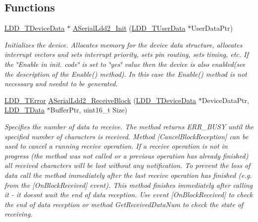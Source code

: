 \subsection*{Functions}
\begin{DoxyCompactItemize}
\item 
\hyperlink{group___p_e___types__module_gac5cf1362f1f0e3a2ce71b1bf2276d091}{L\+D\+D\+\_\+\+T\+Device\+Data} $\ast$ \hyperlink{group___a_serial_ldd2__module_gaa0cd7e49c9c5deb19ce7f9ece16231c3}{A\+Serial\+Ldd2\+\_\+\+Init} (\hyperlink{group___p_e___types__module_ga0b66a73f87238a782318aa0be7578e35}{L\+D\+D\+\_\+\+T\+User\+Data} $\ast$User\+Data\+Ptr)
\begin{DoxyCompactList}\small\item\em Initializes the device. Allocates memory for the device data structure, allocates interrupt vectors and sets interrupt priority, sets pin routing, sets timing, etc. If the \char`\"{}\+Enable
    in init. code\char`\"{} is set to \char`\"{}yes\char`\"{} value then the device is also enabled(see the description of the Enable() method). In this case the Enable() method is not necessary and needn\textquotesingle{}t to be generated. \end{DoxyCompactList}\item 
\hyperlink{group___p_e___types__module_ga24c2b045fd04e79e85f261ce4df35588}{L\+D\+D\+\_\+\+T\+Error} \hyperlink{group___a_serial_ldd2__module_gaf41a4ccffe5f5791cbc9b6e6e912962d}{A\+Serial\+Ldd2\+\_\+\+Receive\+Block} (\hyperlink{group___p_e___types__module_gac5cf1362f1f0e3a2ce71b1bf2276d091}{L\+D\+D\+\_\+\+T\+Device\+Data} $\ast$Device\+Data\+Ptr, \hyperlink{group___p_e___types__module_gade8ef9401405bd941b6da738b807f980}{L\+D\+D\+\_\+\+T\+Data} $\ast$Buffer\+Ptr, uint16\+\_\+t Size)
\begin{DoxyCompactList}\small\item\em Specifies the number of data to receive. The method returns E\+R\+R\+\_\+\+B\+U\+SY until the specified number of characters is received. Method \mbox{[}Cancel\+Block\+Reception\mbox{]} can be used to cancel a running receive operation. If a receive operation is not in progress (the method was not called or a previous operation has already finished) all received characters will be lost without any notification. To prevent the loss of data call the method immediately after the last receive operation has finished (e.\+g. from the \mbox{[}On\+Block\+Received\mbox{]} event). This method finishes immediately after calling it -\/ it doesn\textquotesingle{}t wait the end of data reception. Use event \mbox{[}On\+Block\+Received\mbox{]} to check the end of data reception or method Get\+Received\+Data\+Num to check the state of receiving. \end{DoxyCompactList}\item 

\end{DoxyCompactItemize}
